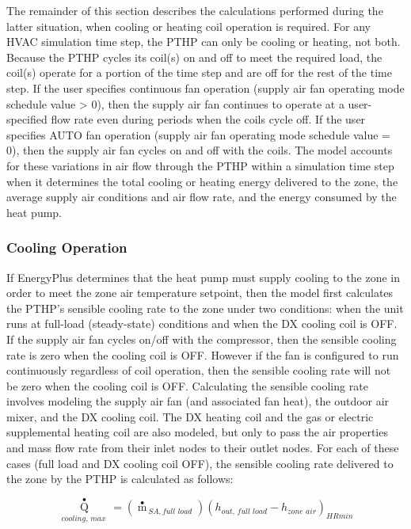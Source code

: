 The remainder of this section describes the calculations performed during the latter situation, when cooling or heating coil operation is required. For any HVAC simulation time step, the PTHP can only be cooling or heating, not both. Because the PTHP cycles its coil(s) on and off to meet the required load, the coil(s) operate for a portion of the time step and are off for the rest of the time step. If the user specifies continuous fan operation (supply air fan operating mode schedule value \textgreater{} 0), then the supply air fan continues to operate at a user-specified flow rate even during periods when the coils cycle off. If the user specifies AUTO fan operation (supply air fan operating mode schedule value = 0), then the supply air fan cycles on and off with the coils. The model accounts for these variations in air flow through the PTHP within a simulation time step when it determines the total cooling or heating energy delivered to the zone, the average supply air conditions and air flow rate, and the energy consumed by the heat pump.

\subsubsection{Cooling Operation}\label{cooling-operation-1-000}

If EnergyPlus determines that the heat pump must supply cooling to the zone in order to meet the zone air temperature setpoint, then the model first calculates the PTHP's sensible cooling rate to the zone under two conditions: when the unit runs at full-load (steady-state) conditions and when the DX cooling coil is OFF. If the supply air fan cycles on/off with the compressor, then the sensible cooling rate is zero when the cooling coil is OFF. However if the fan is configured to run continuously regardless of coil operation, then the sensible cooling rate will not be zero when the cooling coil is OFF. Calculating the sensible cooling rate involves modeling the supply air fan (and associated fan heat), the outdoor air mixer, and the DX cooling coil. The DX heating coil and the gas or electric supplemental heating coil are also modeled, but only to pass the air properties and mass flow rate from their inlet nodes to their outlet nodes. For each of these cases (full load and DX cooling coil OFF), the sensible cooling rate delivered to the zone by the PTHP is calculated as follows:

\begin{equation}
{\mathop Q\limits^ \bullet_{cooling,\,max\,}} = \left( {{{\mathop m\limits^ \bullet  }_{\,SA,full\,\,load}}} \right){\left( {{h_{out,\,full\,\,load}} - {h_{zone\,\,air}}} \right)_{HRmin}}
\end{equation}

